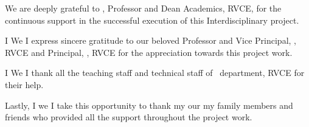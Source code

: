 \ifIDP
We are deeply grateful to \textbf{\printDA}, Professor and Dean Academics, RVCE, 
for the continuous support in the successful execution of this Interdisciplinary project.
\\ \par
\fi

\ifPG I \else \ifStuNameBUsed We \else I \fi\fi express sincere gratitude to our beloved 
Professor and Vice Principal, \textbf{\printVicePrincipal}, RVCE and Principal, 
\textbf{\printPrincipal}, RVCE for the appreciation towards this project work.\\ \par

\ifIDP \else
\ifPG I \else\ifStuNameBUsed We \else I \fi\fi thank all the teaching staff and technical staff of 
\ifIDP \printGuideDeptAInLF\else\printDepartmentLF\fi\, department, RVCE for their help.\\ \par
\fi

Lastly, \ifPG I \else\ifStuNameBUsed we \else I \fi\fi take this opportunity to thank 
\ifPG my \else\ifStuNameBUsed our \else my \fi\fi family members and friends who provided 
all the support throughout the project work.\\ \par